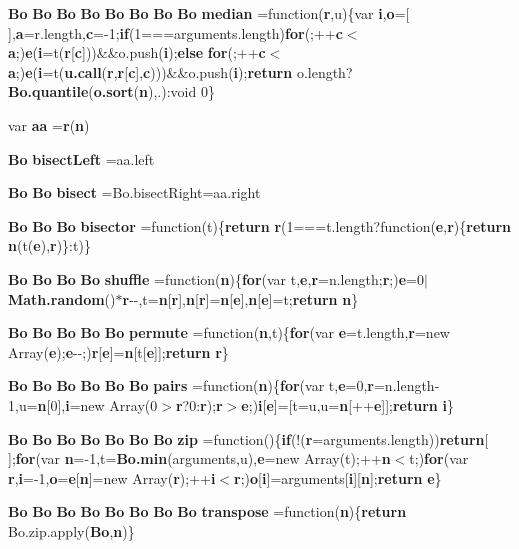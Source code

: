 \begin{DoxyCompactItemize}
\item 
{\bf Bo} {\bf Bo} {\bf Bo} {\bf Bo} {\bf Bo} {\bf Bo} {\bf Bo} {\bf Bo} {\bf median} =function({\bf r},u)\{var {\bf i},{\bf o}=[$\,$],{\bf a}=r.\+length,{\bf c}=-\/1;{\bf if}(1===arguments.\+length){\bf for}(;++{\bf c}$<${\bf a};){\bf e}({\bf i}=t({\bf r}[{\bf c}]))\&\&o.\+push({\bf i});{\bf else} {\bf for}(;++{\bf c}$<${\bf a};){\bf e}({\bf i}=t({\bf u.\+call}({\bf r},{\bf r}[{\bf c}],{\bf c})))\&\&o.\+push({\bf i});{\bf return} o.\+length?{\bf Bo.\+quantile}({\bf o.\+sort}({\bf n}),.)\+:void 0\}
\item 
var {\bf aa} ={\bf r}({\bf n})
\item 
{\bf Bo} {\bf bisect\+Left} =aa.\+left
\item 
{\bf Bo} {\bf Bo} {\bf bisect} =Bo.\+bisect\+Right=aa.\+right
\item 
{\bf Bo} {\bf Bo} {\bf Bo} {\bf bisector} =function(t)\{{\bf return} {\bf r}(1===t.\+length?function({\bf e},{\bf r})\{{\bf return} {\bf n}(t({\bf e}),{\bf r})\}\+:t)\}
\item 
{\bf Bo} {\bf Bo} {\bf Bo} {\bf Bo} {\bf shuffle} =function({\bf n})\{{\bf for}(var t,{\bf e},{\bf r}=n.\+length;{\bf r};){\bf e}=0$\vert${\bf Math.\+random}()$\ast${\bf r}-\/-\/,t={\bf n}[{\bf r}],{\bf n}[{\bf r}]={\bf n}[{\bf e}],{\bf n}[{\bf e}]=t;{\bf return} {\bf n}\}
\item 
{\bf Bo} {\bf Bo} {\bf Bo} {\bf Bo} {\bf Bo} {\bf permute} =function({\bf n},t)\{{\bf for}(var {\bf e}=t.\+length,{\bf r}=new Array({\bf e});{\bf e}-\/-\/;){\bf r}[{\bf e}]={\bf n}[t[{\bf e}]];{\bf return} {\bf r}\}
\item 
{\bf Bo} {\bf Bo} {\bf Bo} {\bf Bo} {\bf Bo} {\bf Bo} {\bf pairs} =function({\bf n})\{{\bf for}(var t,{\bf e}=0,{\bf r}=n.\+length-\/1,u={\bf n}[0],{\bf i}=new Array(0$>${\bf r}?0\+:{\bf r});{\bf r}$>${\bf e};){\bf i}[{\bf e}]=[t=u,u={\bf n}[++{\bf e}]];{\bf return} {\bf i}\}
\item 
{\bf Bo} {\bf Bo} {\bf Bo} {\bf Bo} {\bf Bo} {\bf Bo} {\bf Bo} {\bf zip} =function()\{{\bf if}(!({\bf r}=arguments.\+length)){\bf return}[$\,$];{\bf for}(var {\bf n}=-\/1,t={\bf Bo.\+min}(arguments,u),{\bf e}=new Array(t);++{\bf n}$<$t;){\bf for}(var {\bf r},{\bf i}=-\/1,{\bf o}={\bf e}[{\bf n}]=new Array({\bf r});++{\bf i}$<${\bf r};){\bf o}[{\bf i}]=arguments[{\bf i}][{\bf n}];{\bf return} {\bf e}\}
\item 
{\bf Bo} {\bf Bo} {\bf Bo} {\bf Bo} {\bf Bo} {\bf Bo} {\bf Bo} {\bf Bo} {\bf transpose} =function({\bf n})\{{\bf return} Bo.\+zip.\+apply({\bf Bo},{\bf n})\}

\end{DoxyCompactItemize}
